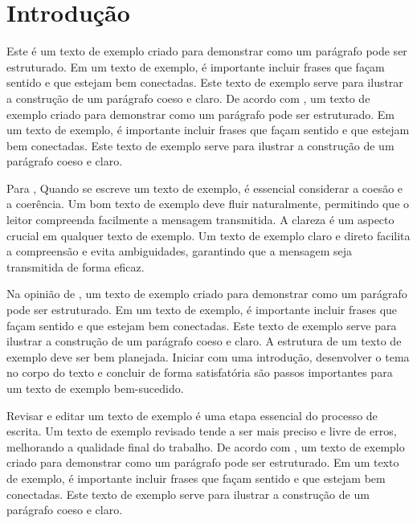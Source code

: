 \documentclass[
	12pt,				%
	oneside,			%
	a4paper,			%
	english,			%
	french,				%
	spanish,			%
	brazil				%
	]{abntex2}
\begin{document}
\tableofcontents*
\cleardoublepage


\textual
\pagestyle{simple}                  %


\hypertarget{introduuxe7uxe3o}{%
\chapter{Introdução}\label{introduuxe7uxe3o}}

Este é um texto de exemplo criado para demonstrar como um parágrafo pode
ser estruturado. Em um texto de exemplo, é importante incluir frases que
façam sentido e que estejam bem conectadas. Este texto de exemplo serve
para ilustrar a construção de um parágrafo coeso e claro. De acordo com
, um texto de exemplo criado para demonstrar como um
parágrafo pode ser estruturado. Em um texto de exemplo, é importante
incluir frases que façam sentido e que estejam bem conectadas. Este
texto de exemplo serve para ilustrar a construção de um parágrafo coeso
e claro.

Para , Quando se escreve um texto de exemplo, é
essencial considerar a coesão e a coerência. Um bom texto de exemplo
deve fluir naturalmente, permitindo que o leitor compreenda facilmente a
mensagem transmitida. A clareza é um aspecto crucial em qualquer texto
de exemplo. Um texto de exemplo claro e direto facilita a compreensão e
evita ambiguidades, garantindo que a mensagem seja transmitida de forma
eficaz.

Na opinião de , um texto de exemplo criado para
demonstrar como um parágrafo pode ser estruturado. Em um texto de
exemplo, é importante incluir frases que façam sentido e que estejam bem
conectadas. Este texto de exemplo serve para ilustrar a construção de um
parágrafo coeso e claro. A estrutura de um texto de exemplo deve ser bem
planejada. Iniciar com uma introdução, desenvolver o tema no corpo do
texto e concluir de forma satisfatória são passos importantes para um
texto de exemplo bem-sucedido.

Revisar e editar um texto de exemplo é uma etapa essencial do processo
de escrita. Um texto de exemplo revisado tende a ser mais preciso e
livre de erros, melhorando a qualidade final do trabalho. De acordo com
, um texto de exemplo criado para demonstrar como um
parágrafo pode ser estruturado. Em um texto de exemplo, é importante
incluir frases que façam sentido e que estejam bem conectadas. Este
texto de exemplo serve para ilustrar a construção de um parágrafo coeso
e claro.
\end{document}
